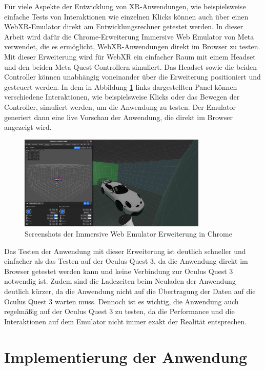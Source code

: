 Für viele Aspekte der Entwicklung von XR-Anwendungen, wie beispielsweise einfache Tests von Interaktionen wie einzelnen Klicks können auch über einen WebXR-Emulator direkt am Entwicklungsrechner getestet werden.
In dieser Arbeit wird dafür die Chrome-Erweiterung Immersive Web Emulator von Meta verwendet, die es ermöglicht, WebXR-Anwendungen direkt im Browser zu testen.
Mit dieser Erweiterung wird für WebXR ein einfacher Raum mit einem Headset und den beiden Meta Quest Controllern simuliert.
Das Headset sowie die beiden Controller können unabhängig voneinander über die Erweiterung positioniert und gesteuert werden.
In dem in Abbildung \ref{fig:webxr-emulator} links dargestellten Panel können verschiedene Interaktionen, wie beispielsweise Klicks oder das Bewegen der Controller, simuliert werden, um die Anwendung zu testen.
Der Emulator generiert dann eine live Vorschau der Anwendung, die direkt im Browser angezeigt wird.

\begin{figure}[H]
    \centering
    \includegraphics[width=0.8\textwidth]{images/WebXR-Emulator.png}
    \caption{Screenshots der Immersive Web Emulator Erweiterung in Chrome}
    \label{fig:webxr-emulator}
\end{figure}

Das Testen der Anwendung mit dieser Erweiterung ist deutlich schneller und einfacher als das Testen auf der Oculus Quest 3, da die Anwendung direkt im Browser getestet werden kann und keine Verbindung zur Oculus Quest 3 notwendig ist.
Zudem sind die Ladezeiten beim Neuladen der Anwendung deutlich kürzer, da die Anwendung nicht auf die Übertragung der Daten auf die Oculus Quest 3 warten muss.
Dennoch ist es wichtig, die Anwendung auch regelmäßig auf der Oculus Quest 3 zu testen, da die Performance und die Interaktionen auf dem Emulator nicht immer exakt der Realität entsprechen.



\section{Implementierung der Anwendung}

